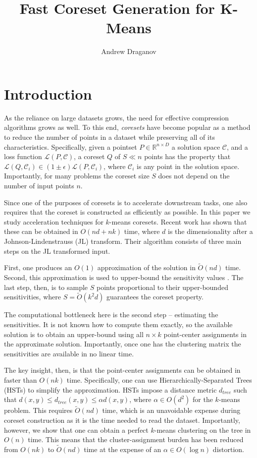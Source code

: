 \documentclass{article}
\title{Fast Coreset Generation for K-Means}
\author{Andrew Draganov}
\theoremstyle{definition}
\begin{document}
\maketitle

\section{Introduction}

As the reliance on large datasets grows, the need for effective compression algorithms grows as well. To this end, \emph{coresets} have become popular as
a method to reduce the number of points in a dataset while preserving all of its characteristics. Specifically, given a pointset $P \in \mathbb{R}^{n \times D}$
a solution space $\mathcal{C}$, and a loss function $\mathcal{L}(P, \mathcal{C})$, a coreset $Q$ of $S \ll n$ points has the property that $\mathcal{L}(Q,
\mathcal{C}_i) \in (1 \pm \epsilon) \mathcal{L}(P, \mathcal{C}_i)$, where $\mathcal{C}_i$ is any point in the solution space. Importantly, for many problems the
coreset size $S$ does not depend on the number of input points $n$. 

Since one of the purposes of coresets is to accelerate downstream tasks, one also requires that the coreset is constructed as efficiently as possible.  In this
paper we study acceleration techniques for $k$-means coresets. Recent work has shown that these can be obtained in $O(nd + nk)$ time, where $d$ is the
dimensionality after a Johnson-Lindenstrauss (JL) transform. Their algorithm consists of three main steps on the JL transformed input.

First, one produces an $O(1)$ approximation of the solution in $\tilde{O}(nd)$ time. Second, this approximation is used to upper-bound
the sensitivity values . The last step, then, is to sample $S$ points proportional to their upper-bounded sensitivities, where $S = \tilde{O}(k^2 d)$
guarantees the coreset property.

The computational bottleneck here is the second step -- estimating the sensitivities. It is not known how to compute them exactly, so the available solution is
to obtain an upper-bound using all $n \times k$ point-center assignments in the approximate solution. Importantly, once one has the clustering matrix the
sensitivities are available in no linear time.

The key insight, then, is that the point-center assignments can be obtained in faster than $O(nk)$ time. Specifically, one can use Hierarchically-Separated
Trees (HSTs) to simplify the approximation. HSTs impose a distance metric $d_{tree}$ such that $d(x, y) \leq d_{tree}(x, y) \leq \alpha d(x, y)$, where $\alpha
\in O(d^2)$ for the $k$-means problem. This requires $\tilde{O}(nd)$ time, which is an unavoidable expense during coreset construction as it is the time needed
to read the dataset.  Importantly, however, we show that one can obtain a perfect $k$-means clustering on the tree in $O(n)$ time. This means that the
cluster-assignment burden has been reduced from $O(nk)$ to $\tilde{O}(nd)$ time at the expense of an $\alpha \in O(\log n)$ distortion.
\end{document}
